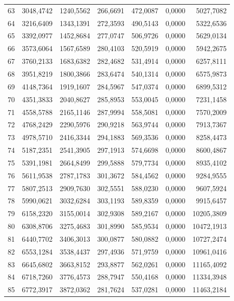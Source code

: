 \begin{small}
\begin{longtable}{rrrrrrr}
63 & 3048,4742 & 1240,5562 & 266,6691 & 472,0087 & 0,0000 & 5027,7082 \\
64 & 3216,6409 & 1343,1391 & 272,3593 & 490,5143 & 0,0000 & 5322,6536 \\
65 & 3392,0977 & 1452,8684 & 277,0747 & 506,9726 & 0,0000 & 5629,0134 \\
66 & 3573,6064 & 1567,6589 & 280,4103 & 520,5919 & 0,0000 & 5942,2675 \\
67 & 3760,2133 & 1683,6382 & 282,4682 & 531,4914 & 0,0000 & 6257,8111 \\
68 & 3951,8219 & 1800,3866 & 283,6474 & 540,1314 & 0,0000 & 6575,9873 \\
69 & 4148,7364 & 1919,1607 & 284,5967 & 547,0374 & 0,0000 & 6899,5312 \\
70 & 4351,3833 & 2040,8627 & 285,8953 & 553,0045 & 0,0000 & 7231,1458 \\
71 & 4558,5788 & 2165,1146 & 287,9994 & 558,5081 & 0,0000 & 7570,2009 \\
72 & 4768,2429 & 2290,5976 & 290,9218 & 563,9744 & 0,0000 & 7913,7367 \\
73 & 4978,5710 & 2416,3344 & 294,1883 & 569,3536 & 0,0000 & 8258,4473 \\
74 & 5187,2351 & 2541,3905 & 297,1913 & 574,6698 & 0,0000 & 8600,4867 \\
75 & 5391,1981 & 2664,8499 & 299,5888 & 579,7734 & 0,0000 & 8935,4102 \\
76 & 5611,9538 & 2787,1783 & 301,3672 & 584,4562 & 0,0000 & 9284,9555 \\
77 & 5807,2513 & 2909,7630 & 302,5551 & 588,0230 & 0,0000 & 9607,5924 \\
78 & 5990,0621 & 3032,6284 & 303,1193 & 589,8359 & 0,0000 & 9915,6457 \\
79 & 6158,2320 & 3155,0014 & 302,9308 & 589,2167 & 0,0000 & 10205,3809 \\
80 & 6308,8706 & 3275,4683 & 301,8990 & 585,9534 & 0,0000 & 10472,1913 \\
81 & 6440,7702 & 3406,3013 & 300,0877 & 580,0882 & 0,0000 & 10727,2474 \\
82 & 6553,1284 & 3538,4437 & 297,4936 & 571,9759 & 0,0000 & 10961,0416 \\
83 & 6645,6802 & 3663,8152 & 293,8877 & 562,0261 & 0,0000 & 11165,4092 \\
84 & 6718,7260 & 3776,4573 & 288,7947 & 550,4168 & 0,0000 & 11334,3948 \\
85 & 6772,3917 & 3872,0362 & 281,7624 & 537,0281 & 0,0000 & 11463,2184 \\

\end{longtable}
\end{small}

